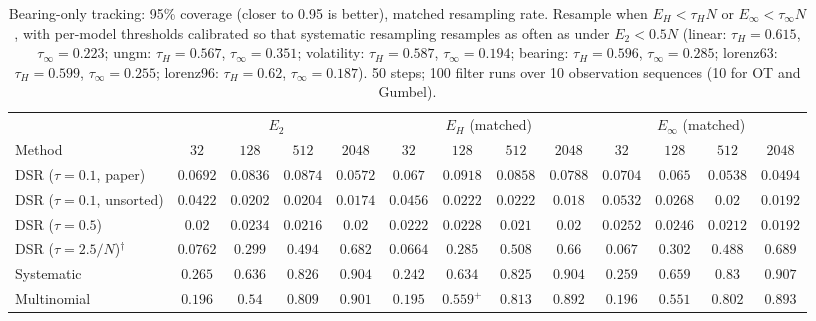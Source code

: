 \begin{table}[ht]
\centering
\small
\caption{Bearing-only tracking: 95\% coverage (closer to 0.95 is better), matched resampling rate. Resample when $E_H<\tau_HN$ or $E_\infty<\tau_\infty N$, with per-model thresholds calibrated so that systematic resampling resamples as often as under $E_2<0.5N$ (linear: $\tau_H{=}0.615$, $\tau_\infty{=}0.223$; ungm: $\tau_H{=}0.567$, $\tau_\infty{=}0.351$; volatility: $\tau_H{=}0.587$, $\tau_\infty{=}0.194$; bearing: $\tau_H{=}0.596$, $\tau_\infty{=}0.285$; lorenz63: $\tau_H{=}0.599$, $\tau_\infty{=}0.255$; lorenz96: $\tau_H{=}0.62$, $\tau_\infty{=}0.187$). 50 steps; 100 filter runs over 10 observation sequences (10 for OT and Gumbel).}
\label{tab:trigger-matched-bearing-coverage95}
\begin{adjustbox}{max width=\linewidth}
\begin{tabular}{lcccc|cccc|cccc}
\toprule
 & \multicolumn{4}{c}{$E_2$} & \multicolumn{4}{c}{$E_H$ (matched)} & \multicolumn{4}{c}{$E_\infty$ (matched)} \\
\cmidrule(lr){2-5} \cmidrule(lr){6-9} \cmidrule(lr){10-13}
Method & $32$ & $128$ & $512$ & $2048$ & $32$ & $128$ & $512$ & $2048$ & $32$ & $128$ & $512$ & $2048$ \\
\midrule
DSR ($\tau{=}0.1$, paper) & $0.0692$ & $0.0836$ & $\mathbf{0.0874}$ & $0.0572$ & $0.067$ & $\mathbf{0.0918}$ & $0.0858$ & $\mathbf{0.0788}$ & $\mathbf{0.0704}$ & $0.065$ & $0.0538$ & $0.0494$ \\
DSR ($\tau{=}0.1$, unsorted) & $0.0422$ & $0.0202$ & $0.0204$ & $0.0174$ & $0.0456$ & $0.0222$ & $\mathbf{0.0222}$ & $0.018$ & $\mathbf{0.0532}$ & $\mathbf{0.0268}$ & $0.02$ & $\mathbf{0.0192}$ \\
DSR ($\tau{=}0.5$) & $0.02$ & $0.0234$ & $\mathbf{0.0216}$ & $\mathbf{0.02}$ & $0.0222$ & $0.0228$ & $0.021$ & $\mathbf{0.02}$ & $\mathbf{0.0252}$ & $\mathbf{0.0246}$ & $0.0212$ & $0.0192$ \\
DSR ($\tau{=}2.5/N$)$^\dagger$ & $\mathbf{0.0762}$ & $0.299$ & $0.494$ & $0.682$ & $0.0664$ & $0.285$ & $\mathbf{0.508}$ & $0.66$ & $0.067$ & $\mathbf{0.302}$ & $0.488$ & $\mathbf{0.689}$ \\
\midrule
Systematic & $\mathbf{0.265}$ & $0.636$ & $0.826$ & $0.904$ & $0.242$ & $0.634$ & $0.825$ & $0.904$ & $0.259$ & $\mathbf{0.659}$ & $\mathbf{0.83}$ & $\mathbf{0.907}$ \\
Multinomial & $\mathbf{0.196}$ & $0.54$ & $0.809$ & $\mathbf{0.901}$ & $0.195$ & $\mathbf{0.559}^{+}$ & $\mathbf{0.813}$ & $0.892$ & $\mathbf{0.196}$ & $0.551$ & $0.802$ & $0.893$ \\

\end{tabular}
\end{adjustbox}
\end{table}
